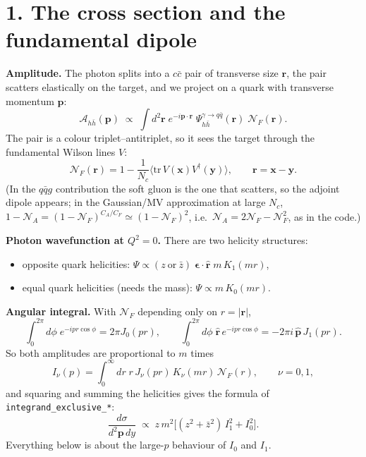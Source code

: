 \documentclass[12pt]{article}
\begin{document}
\section*{1. The cross section and the fundamental dipole}

\textbf{Amplitude.} The photon splits into a $c\bar c$ pair of transverse size $\mathbf{r}$, the pair
scatters elastically on the target, and we project on a quark with transverse momentum $\mathbf{p}$:
\[
  \mathcal{A}_{h\bar h}(\mathbf{p})\;\propto\;\int d^2\mathbf{r}\;e^{-i\mathbf{p}\cdot\mathbf{r}}\;
  \Psi^{\gamma\to q\bar q}_{h\bar h}(\mathbf{r})\;\mathcal{N}_F(\mathbf{r}).
\]
The pair is a colour triplet--antitriplet, so it sees the target through the fundamental Wilson lines
$V$:
\[
  \mathcal{N}_F(\mathbf{r})=1-\frac{1}{N_c}\big\langle\mathrm{tr}\,V(\mathbf{x})V^\dagger(\mathbf{y})\big\rangle,
  \qquad \mathbf{r}=\mathbf{x}-\mathbf{y}.
\]
(In the $q\bar qg$ contribution the soft gluon is the one that scatters, so the adjoint dipole appears;
in the Gaussian/MV approximation at large $N_c$, $1-\mathcal{N}_A=(1-\mathcal{N}_F)^{C_A/C_F}\simeq(1-\mathcal{N}_F)^2$,
i.e.\ $\mathcal{N}_A=2\mathcal{N}_F-\mathcal{N}_F^2$, as in the code.)

\textbf{Photon wavefunction at $Q^2=0$.} There are two helicity structures:
\begin{itemize}
\item opposite quark helicities: $\Psi\propto(z\ \text{or}\ \bar z)\;\boldsymbol{\epsilon}\cdot\hat{\mathbf r}\;
m\,K_1(mr)$,
\item equal quark helicities (needs the mass): $\Psi\propto m\,K_0(mr)$.
\end{itemize}

\textbf{Angular integral.} With $\mathcal{N}_F$ depending only on $r=|\mathbf r|$,
\[
  \int_0^{2\pi}\!d\phi\;e^{-ipr\cos\phi}=2\pi J_0(pr),\qquad
  \int_0^{2\pi}\!d\phi\;\hat{\mathbf r}\,e^{-ipr\cos\phi}=-2\pi i\,\hat{\mathbf p}\,J_1(pr).
\]
So both amplitudes are proportional to $m$ times
\begin{equation}
  I_\nu(p)=\int_0^\infty dr\;r\,J_\nu(pr)\,K_\nu(mr)\,\mathcal{N}_F(r),\qquad\nu=0,1,
  \label{eq:I}
\end{equation}
and squaring and summing the helicities gives the formula of \texttt{integrand\_exclusive\_*}:
\begin{equation}
  \frac{d\sigma}{d^2\mathbf p\,dy}\;\propto\;z\,m^2\Big[(z^2+\bar z^2)\,I_1^2+I_0^2\Big].
  \label{eq:sigma}
\end{equation}
Everything below is about the large-$p$ behaviour of $I_0$ and $I_1$.
\end{document}
